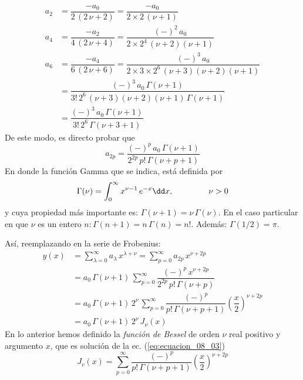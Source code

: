 \begin{align*}
a_{2} &= \dfrac{-a_{0}}{2 \, (2 \, \nu + 2)} = \dfrac{-a_{0}}{2 \times 2 \, (\nu + 1)} \\
a_{4} &= \dfrac{-a_{2}}{4 \, (2 \, \nu + 4)} = \dfrac{(-)^{2} \, a_{0}}{2 \times 2^{4} \, (\nu + 2)(\nu + 1)} \\
a_{6} &= \dfrac{-a_{4}}{6 \, (2 \, \nu + 6)} = \dfrac{(-)^{3} \, a_{0}}{2 \times 3 \times 2^{6} \, (\nu + 3)(\nu + 2)(\nu + 1)} \\
&= \dfrac{(-)^{3} \, a_{0} \, \Gamma (\nu + 1)}{3! \, 2^{6} \, (\nu + 3)(\nu + 2)(\nu + 1) \, \Gamma (\nu + 1)} \\
&= \dfrac{(-)^{3} \, a_{0} \, \Gamma (\nu + 1)}{3! \, 2^{6} \, \Gamma (\nu + 3 + 1)}
\end{align*}
De este modo, es directo probar que
\begin{equation}
a_{2p} = \dfrac{(-)^{p} \, a_{0} \, \Gamma (\nu + 1)}{2^{2p} \, p! \, \Gamma (\nu + p + 1)}
\label{eq:ecuacion_08_05}
\end{equation}
En donde la función Gamma que se indica, está definida por
\[ \Gamma (\nu) = \int_{0}^{\infty} x^{\nu-1} \, e^{-x} \dd x, \hspace{1.5cm} \nu > 0 \]
y cuya propiedad más importante es: $\Gamma (\nu + 1) = \nu \, \Gamma (\nu)$. En el caso particular en que $\nu$ es un entero $n: \Gamma (n + 1) = n \, \Gamma (n) = n!$. Además: $\Gamma (1/2) = \pi$.
\par
Así, reemplazando en la serie de Frobenius:
\begin{align*}
y(x) &= \sum_{\lambda=0}^{\infty} a_{\lambda} \, x^{\lambda+\nu} = \sum_{p=0}^{\infty} a_{2p} \, x^{\nu+2p} \\
&= a_{0} \, \Gamma (\nu + 1) \, \sum_{p=0}^{\infty} \dfrac{(-)^{p} \, x^{\nu+2p}}{2^{2p} \, p! \, \Gamma (\nu + p)} \\
&= a_{0} \, \Gamma (\nu + 1) \, 2^{\nu} \, \sum_{p=0}^{\infty} \dfrac{(-)^{p}}{p! \, \Gamma (\nu + p + 1)} \left( \dfrac{x}{2} \right)^{\nu+2p} \\
&= a_{0} \, \Gamma (\nu + 1) \, 2^{\nu} \, J_{\nu} (x)
\end{align*}
En lo anterior hemos definido la \emph{función de Bessel} de orden $\nu$ real positivo y argumento $x$, que es solución de la ec. (\ref{eq:ecuacion_08_03})
\begin{equation}
\boxed{J_{v} (x) = \sum_{p=0}^{\infty} \dfrac{(-)^{p}}{p! \, \Gamma (\nu + p + 1)} \left( \dfrac{x}{2} \right)^{\nu+2p}}
\label{eq:ecuacion_08_06}
\end{equation}
